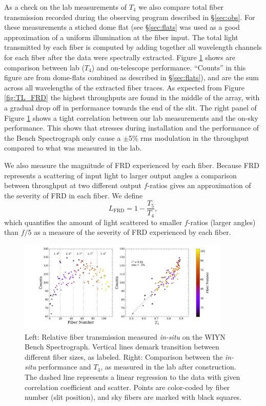 \begin{appendices}
As a check on the lab measurements of $T_4$ we also compare total
fiber transmission recorded during the observing program described in
\S\ref{sec:obs}. For these measurements a stiched dome flat (see
\S\ref{sec:flats} was used as a good approximation of a uniform
illumination at the fiber input. The total light transmitted by each
fiber is computed by adding together all wavelength channels for each
fiber after the data were spectrally extracted. Figure
\ref{fig:count_tput} shows are comparison between lab ($T_4$) and
on-telescope performance. ``Counts'' in this figure are from
dome-flats combined as described in \S\ref{sec:flats}), and are the
sum across all wavelengths of the extracted fiber traces.  As expected
from Figure \ref{fig:TL_FRD} the highest throughputs are found in the
middle of the array, with a gradual drop off in performance towards
the end of the slit. The right panel of Figure \ref{fig:count_tput}
shows a tight correlation between our lab measurements and the on-sky
performance. This shows that stresses during installation and the
performance of the Bench Spectrograph only cause a $\pm$5\% rms
modulation in the throughput compared to what was measured in the lab.

We also measure the magnitude of FRD experienced by each
fiber. Because FRD represents a scattering of input light to larger
output angles a comparison between throughput at two different output
$f$-ratios gives an approximation of the severity of FRD in each
fiber. We define
\begin{equation}
\label{eq:L_FRD}
  L_\mathrm{FRD} = 1 - \frac{T_5}{T_4},
\end{equation}
which quantifies the amount of light scattered to smaller $f$-ratios
(larger angles) than $f/5$ as a measure of the severity of FRD
experienced by each fiber.

\begin{figure}
  \centering
  \includegraphics[width=0.9\textwidth]{891_1/figs/gradpak_count_plots.pdf}
  \caption{\label{fig:count_tput}\fixspacing Left: Relative fiber
    transmission measured \emph{in-situ} on the WIYN Bench
    Spectrograph. Vertical lines demark transition between different
    fiber sizes, as labeled. Right: Comparison between the
    \emph{in-situ} performance and $T_4$, as measured in the lab after
    construction. The dashed line represents a linear regression to
    the data with given correlation coefficient and scatter. Points
    are color-coded by fiber number (slit position), and sky fibers
    are marked with black squares.}
\end{figure}


\end{appendices}
